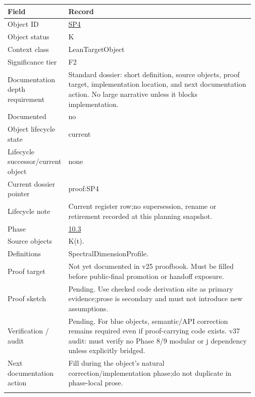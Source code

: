 \begin{longtable}{L{0.16\linewidth} L{0.81\linewidth}}
\hline
\textbf{Field} & \textbf{Record}\\
\hline
Object ID & \hyperlink{object-row-SP4}{SP4}\\
\hline\addlinespace[0.20em]
Object status & K\\
\hline\addlinespace[0.20em]
Context class & LeanTargetObject\\
\hline\addlinespace[0.20em]
Significance tier & F2\\
\hline\addlinespace[0.20em]
Documentation depth requirement & Standard dossier: short definition, source objects, proof target, implementation location, and next documentation action. No large narrative unless it blocks implementation.\\
\hline\addlinespace[0.20em]
Documented & no\\
\hline\addlinespace[0.20em]
Object lifecycle state & current\\
\hline\addlinespace[0.20em]
Lifecycle successor/\allowbreak{}current object & none\\
\hline\addlinespace[0.20em]
Current dossier pointer & proof:SP4\\
\hline\addlinespace[0.20em]
Lifecycle note & Current register row;\newline no supersession, rename or retirement recorded at this planning snapshot.\\
\hline\addlinespace[0.20em]
Phase & \hyperlink{phase-row-10-3}{10.3}\\
\hline\addlinespace[0.20em]
Source objects & K(t).\\
\hline\addlinespace[0.20em]
Definitions & SpectralDimensionProfile.\\
\hline\addlinespace[0.20em]
Proof target & Not yet documented in v25 proofbook. Must be filled before public-final promotion or handoff exposure.\\
\hline\addlinespace[0.20em]
Proof sketch & Pending. Use checked code derivation site as primary evidence;\newline prose is secondary and must not introduce new assumptions.\\
\hline\addlinespace[0.20em]
Verification /\allowbreak{} audit & Pending. For blue objects, semantic/\allowbreak{}API correction remains required even if proof-carrying code exists. v37 audit: must verify no Phase 8/\allowbreak{}9 modular or j dependency unless explicitly bridged.\\
\hline\addlinespace[0.20em]
Next documentation action & Fill during the object's natural correction/\allowbreak{}implementation phase;\newline do not duplicate in phase-local prose.\\
\hline\addlinespace[0.20em]
\end{longtable}
